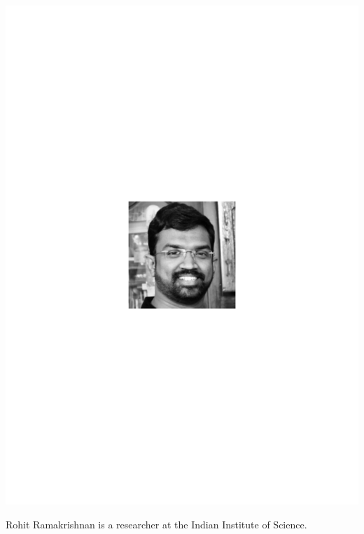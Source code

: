 \includegraphics[width=\columnwidth]{photo_rohit_ramakrishnan}

Rohit Ramakrishnan is a researcher at the Indian Institute of Science.


